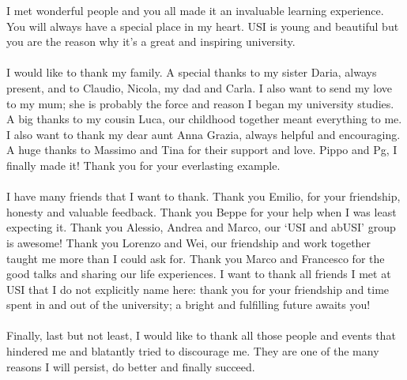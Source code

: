 \documentclass[11pt, mscthesis]{usiinfthesis}
\begin{document}
\begin{acknowledgements}
I met wonderful people and you all made it an invaluable learning experience. You will always have a special place in my heart. USI is young and beautiful but you are the reason why it’s a great and inspiring university.
\\
\\
I would like to thank my family. A special thanks to my sister Daria, always present, and to Claudio, Nicola, my dad and Carla. I also want to send my love to my mum; she is probably the force and reason I began my university studies. A big thanks to my cousin Luca, our childhood together meant everything to me. I also want to thank my dear aunt Anna Grazia, always helpful and encouraging. A huge thanks to Massimo and Tina for their support and love. Pippo and Pg, I finally made it! Thank you for your everlasting example. 
\\
\\
I have many friends that I want to thank. Thank you Emilio, for your friendship, honesty and valuable feedback. Thank you Beppe for your help when I was least expecting it. Thank you Alessio, Andrea and Marco, our `USI and abUSI' group is awesome! Thank you Lorenzo and Wei, our friendship and work together taught me more than I could ask for. Thank you Marco and Francesco for the good talks and sharing our life experiences.  I want to thank all friends I met at USI that I do not explicitly name here: thank you for your friendship and time spent in and out of the university; a bright and fulfilling future awaits you!
\\
\\
Finally, last but not least, I would like to thank all those people and events that hindered me and blatantly tried to discourage me. They are one of the many reasons I will persist, do better and finally succeed.


\end{acknowledgements}

\tableofcontents 
\listoffigures %
\listoftables %

\mainmatter










\appendix


\end{document}
